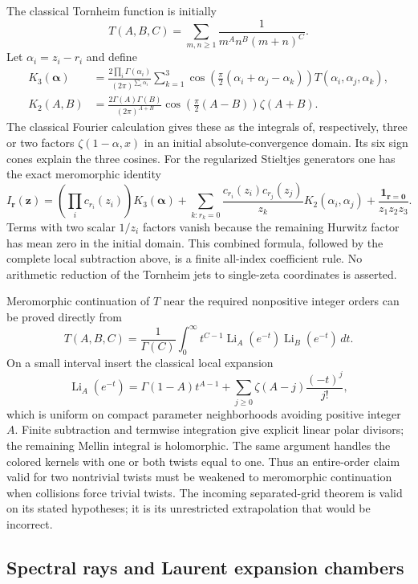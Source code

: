\documentclass[11pt,a4paper]{article}
\numberwithin{equation}{section}
\theoremstyle{definition}
\theoremstyle{remark}
\begin{document}
The classical Tornheim function is initially
\[
 T(A,B,C)=\sum_{m,n\ge1}\frac1{m^A n^B(m+n)^C}.
\]
Let $\alpha_i=z_i-r_i$ and define
\begin{align*}
 K_3(\boldsymbol\alpha)
 &=\frac{2\prod_i\Gamma(\alpha_i)}{(2\pi)^{\sum_i\alpha_i}}
   \sum_{k=1}^3
   \cos\!\left(\frac\pi2(\alpha_i+\alpha_j-\alpha_k)\right)
        T(\alpha_i,\alpha_j,\alpha_k),\\
 K_2(A,B)&=\frac{2\Gamma(A)\Gamma(B)}{(2\pi)^{A+B}}
          \cos\!\left(\frac\pi2(A-B)\right)\zeta(A+B).
\end{align*}
The classical Fourier calculation \cite{EspinosaMoll} gives these as the integrals of,
respectively, three or two factors $\zeta(1-\alpha,x)$ in an initial
absolute-convergence domain. Its six sign cones explain the three
cosines. For the regularized Stieltjes generators one has the exact
meromorphic identity
\[
 I_{\boldsymbol r}(\boldsymbol z)
 =\left(\prod_i c_{r_i}(z_i)\right)K_3(\boldsymbol\alpha)
  +\sum_{k:r_k=0}\frac{c_{r_i}(z_i)c_{r_j}(z_j)}{z_k}
                  K_2(\alpha_i,\alpha_j)
  +\frac{\mathbf 1_{\boldsymbol r=\boldsymbol0}}{z_1z_2z_3}.
\]
Terms with two scalar $1/z_i$ factors vanish because the remaining
Hurwitz factor has mean zero in the initial domain. This combined
formula, followed by the complete local subtraction above, is a
finite all-index coefficient rule. No arithmetic reduction of the
Tornheim jets to single-zeta coordinates is asserted.

Meromorphic continuation of $T$ near the required nonpositive integer
orders can be proved directly from
\[
 T(A,B,C)=\frac1{\Gamma(C)}\int_0^\infty
 t^{C-1}\operatorname{Li}_A(e^{-t})\operatorname{Li}_B(e^{-t})\,dt.
\]
On a small interval insert the classical local expansion \cite[Equation~25.12.12]{DLMFPolylog}
\[
 \operatorname{Li}_A(e^{-t})
 =\Gamma(1-A)t^{A-1}
       +\sum_{j\ge0}\zeta(A-j)\frac{(-t)^j}{j!},
\]
which is uniform on compact parameter neighborhoods avoiding positive
integer $A$. Finite subtraction and termwise integration give explicit
linear polar divisors; the remaining Mellin integral is holomorphic.
The same argument handles the colored kernels with one or both twists
equal to one. Thus an entire-order claim valid for two nontrivial
twists must be weakened to meromorphic continuation when collisions
force trivial twists. The incoming separated-grid theorem is valid
on its stated hypotheses; it is its unrestricted extrapolation that
would be incorrect.

\subsection{Spectral rays and Laurent expansion chambers}
\label{cl:spectral}
\end{document}
